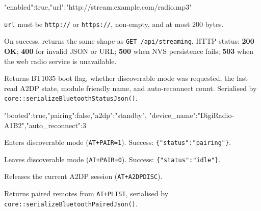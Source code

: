 \begin{drnote}
\begin{drcode}[JSON]
{"enabled":true,"url":"http://stream.example.com/radio.mp3"}
\end{drcode}
\texttt{url} must be \texttt{http://} or \texttt{https://}, non-empty,
and at most 200 bytes.
\end{drnote}

On success, returns the same shape as \texttt{GET /api/streaming}. HTTP
status: \textbf{200 OK}; \textbf{400} for invalid JSON or URL;
\textbf{500} when NVS persistence fails; \textbf{503} when the web radio
service is unavailable.


\label{sec:api-bluetooth-status}

Returns BT1035 boot flag, whether discoverable mode was requested, the
last read A2DP state, module friendly name, and auto-reconnect count.
Serialised by \texttt{core::serializeBluetoothStatusJson()}.

\begin{drnote}
\begin{drcode}[JSON]
{"booted":true,"pairing":false,"a2dp":"standby",
 "device_name":"DigiRadio-A1B2","auto_reconnect":3}
\end{drcode}
\end{drnote}

\label{sec:api-bluetooth-pair}

Enters discoverable mode (\texttt{AT+PAIR=1}). Success:
\texttt{\{"status":"pairing"\}}.

\label{sec:api-bluetooth-pair-stop}

Leaves discoverable mode (\texttt{AT+PAIR=0}). Success:
\texttt{\{"status":"idle"\}}.

\label{sec:api-bluetooth-disconnect}

Releases the current A2DP session (\texttt{AT+A2DPDISC}).

\label{sec:api-bluetooth-paired}

Returns paired remotes from \texttt{AT+PLIST}, serialised by
\texttt{core::serializeBluetoothPairedJson()}.

